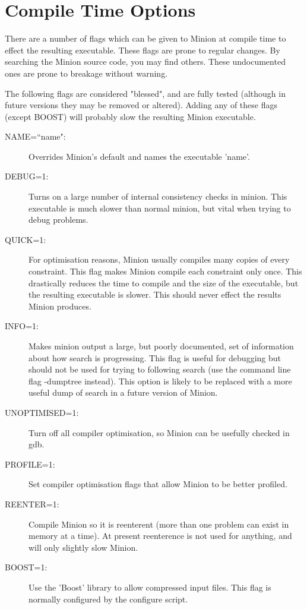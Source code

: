 \documentclass[oneside]{book}
\begin{document}
\section{Compile Time Options}

There are a number of flags which can be given to Minion at compile time to effect the resulting executable. These flags are prone to regular changes. By searching the Minion source code, you may find others. These undocumented ones are prone to breakage without warning.

The following flags are considered "blessed", and are fully tested (although in future versions they may be removed or altered). Adding any of these flags (except BOOST) will probably slow the resulting Minion executable.

\begin{description}
\item[NAME=``name":] Overrides Minion's default and names the executable 'name'.
\item[DEBUG=1:] Turns on a large number of internal consistency checks in minion. This executable is much slower than normal minion, but vital when trying to debug problems.
\item[QUICK=1:] For optimisation reasons, Minion usually compiles many copies of every constraint. This flag makes Minion compile each constraint only once. This drastically reduces the time to compile and the size of the executable, but the resulting executable is slower. This should never effect the results Minion produces.
\item[INFO=1:] Makes minion output a large, but poorly documented, set of information about how search is progressing. This flag is useful for debugging but should not be used for trying to following search (use the command line flag -dumptree instead). This option is likely to be replaced with a more useful dump of search in a future version of Minion.
\item[UNOPTIMISED=1:] Turn off all compiler optimisation, so Minion can be usefully checked in gdb.
\item[PROFILE=1:] Set compiler optimisation flags that allow Minion to be better profiled.
\item[REENTER=1:] Compile Minion so it is reenterent (more than one problem can exist in memory at a time). At present reenterence is not used for anything, and will only slightly slow Minion.
\item[BOOST=1:] Use the 'Boost' library to allow compressed input files. This flag is normally configured by the configure script.
\end{description}
\end{document}

